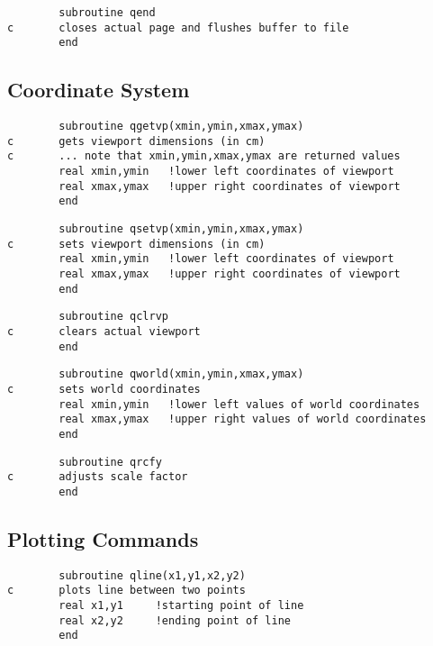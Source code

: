 \documentclass{article}
\begin{document}
\begin{verbatim}
        subroutine qend
c       closes actual page and flushes buffer to file
        end
\end{verbatim}


\subsection{Coordinate System}


\begin{verbatim}
        subroutine qgetvp(xmin,ymin,xmax,ymax)
c       gets viewport dimensions (in cm)
c       ... note that xmin,ymin,xmax,ymax are returned values
        real xmin,ymin   !lower left coordinates of viewport
        real xmax,ymax   !upper right coordinates of viewport
        end
\end{verbatim}

\begin{verbatim}
        subroutine qsetvp(xmin,ymin,xmax,ymax)
c       sets viewport dimensions (in cm)
        real xmin,ymin   !lower left coordinates of viewport
        real xmax,ymax   !upper right coordinates of viewport
        end
\end{verbatim}

\begin{verbatim}
        subroutine qclrvp
c       clears actual viewport
        end
\end{verbatim}

\begin{verbatim}
        subroutine qworld(xmin,ymin,xmax,ymax)
c       sets world coordinates
        real xmin,ymin   !lower left values of world coordinates
        real xmax,ymax   !upper right values of world coordinates
        end
\end{verbatim}

\begin{verbatim}
        subroutine qrcfy
c       adjusts scale factor
        end
\end{verbatim}


\subsection{Plotting Commands}


\begin{verbatim}
        subroutine qline(x1,y1,x2,y2)
c       plots line between two points
        real x1,y1     !starting point of line
        real x2,y2     !ending point of line
        end
\end{verbatim}
\end{document}
